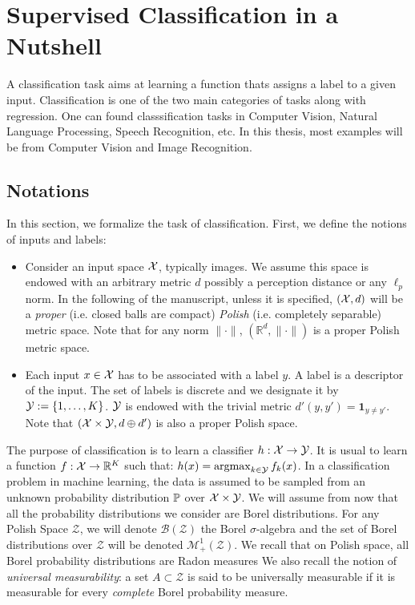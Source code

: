 \section{Supervised Classification in a Nutshell}
A classification task aims at learning a function thats assigns a label to a given input. Classification is one of the two main categories of tasks along with regression. One can found classsification tasks in Computer Vision, Natural Language Processing, Speech Recognition, etc. In this thesis, most examples will be from Computer Vision and Image Recognition. 
\subsection{Notations}
In this section, we formalize the task of classification. First, we define the notions of inputs and labels:
\begin{itemize}
    \item Consider an input space $\mathcal{X}$, typically images. We assume this space is endowed with an arbitrary metric $d$ possibly a perception distance or any $\ell_p$ norm. In the following of the manuscript, unless it is specified, $(\mathcal{X},d)$ will be a \textit{proper} (i.e. closed balls are compact) \textit{Polish} (i.e. completely separable) metric space. Note that for any norm $\lVert\cdot\rVert$,  $(\mathbb{R}^d,\lVert\cdot\rVert)$ is a proper Polish metric space.
    \item Each input $x\in \mathcal{X}$ has to be associated with a label $y$. A label is a descriptor of the input. The set of labels is discrete and we designate it by $\mathcal{Y}:=\{1,\dots,K\}$. $\mathcal{Y}$ is endowed with the trivial metric  $d'(y,y') = \mathbf{1}_{y\neq y'}$. Note that $(\mathcal{X}\times\mathcal{Y},d\oplus d')$ is also a proper Polish space.
\end{itemize}

The purpose of classification is to learn a classifier $h:\mathcal{X}\to\mathcal{Y}$. It is usual to learn a function $f:\mathcal{X}\to\mathbb{R}^K$ such that: $h(x) = \operatorname*{argmax}_{k\in\mathcal{Y}}f_k(x)$. In a classification problem in machine learning, the data is assumed to be sampled from an unknown probability distribution $\mathbb{P}$ over $\mathcal{X}\times\mathcal{Y}$. We will assume from now that all the probability distributions we consider are Borel distributions. For any Polish Space $\mathcal{Z}$, we will denote $\mathcal{B}(\mathcal{Z})$ the Borel $\sigma$-algebra and the set of Borel distributions over $\mathcal{Z}$  will be denoted $\mathcal{M}_+^1(\mathcal{Z})$. We recall that on Polish space, all Borel probability distributions are Radon measures We also recall the notion of \textit{universal measurability}: a set $A\subset \mathcal{Z}$ is said to be universally measurable if it is measurable for every \textit{complete} Borel probability measure.




